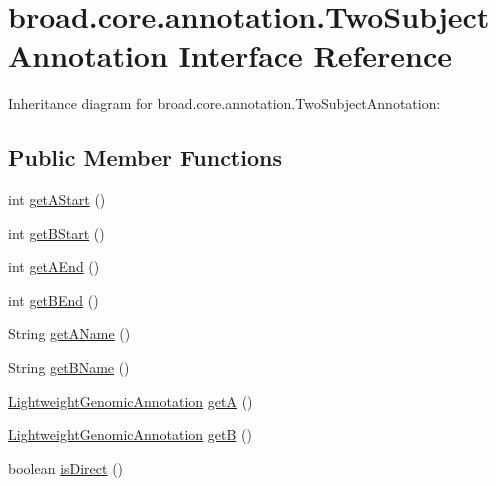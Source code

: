 \hypertarget{interfacebroad_1_1core_1_1annotation_1_1_two_subject_annotation}{\section{broad.\+core.\+annotation.\+Two\+Subject\+Annotation Interface Reference}
\label{interfacebroad_1_1core_1_1annotation_1_1_two_subject_annotation}
}


Inheritance diagram for broad.\+core.\+annotation.\+Two\+Subject\+Annotation\+:
\subsection*{Public Member Functions}
\begin{DoxyCompactItemize}
\item 
int \hyperlink{interfacebroad_1_1core_1_1annotation_1_1_two_subject_annotation_a53788b14799a78deac390727cb63903e}{get\+A\+Start} ()
\item 
int \hyperlink{interfacebroad_1_1core_1_1annotation_1_1_two_subject_annotation_a90ea6b2f236446912c96c69fdc9f9925}{get\+B\+Start} ()
\item 
int \hyperlink{interfacebroad_1_1core_1_1annotation_1_1_two_subject_annotation_a52f210c4bb64c12dbd512cb9f1f4a3c2}{get\+A\+End} ()
\item 
int \hyperlink{interfacebroad_1_1core_1_1annotation_1_1_two_subject_annotation_a7466b3990a5910edcfd2be466d775dc5}{get\+B\+End} ()
\item 
String \hyperlink{interfacebroad_1_1core_1_1annotation_1_1_two_subject_annotation_a37a57d624fcbd8c2d9de07716aaa6330}{get\+A\+Name} ()
\item 
String \hyperlink{interfacebroad_1_1core_1_1annotation_1_1_two_subject_annotation_ad92db50fa9151210d578dd61148e0e4d}{get\+B\+Name} ()
\item 
\hyperlink{interfacebroad_1_1core_1_1annotation_1_1_lightweight_genomic_annotation}{Lightweight\+Genomic\+Annotation} \hyperlink{interfacebroad_1_1core_1_1annotation_1_1_two_subject_annotation_a61054032506058267657aaf0725666ec}{get\+A} ()
\item 
\hyperlink{interfacebroad_1_1core_1_1annotation_1_1_lightweight_genomic_annotation}{Lightweight\+Genomic\+Annotation} \hyperlink{interfacebroad_1_1core_1_1annotation_1_1_two_subject_annotation_a7e6486d879fc7a4a98f292ed8fc8ebee}{get\+B} ()
\item 
boolean \hyperlink{interfacebroad_1_1core_1_1annotation_1_1_two_subject_annotation_a06572a7c14612d2563b23d6e6b4ce57e}{is\+Direct} ()
\end{DoxyCompactItemize}


